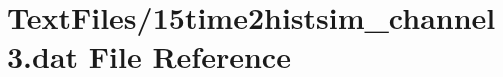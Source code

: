\hypertarget{15time2histsim__channel3_8dat}{}\section{Text\+Files/15time2histsim\+\_\+channel3.dat File Reference}
\label{15time2histsim__channel3_8dat}
